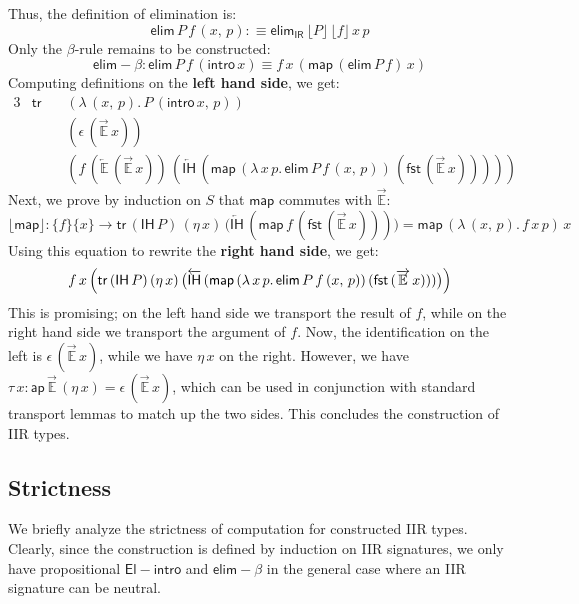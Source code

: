 \documentclass[acmsmall,screen,review,anonymous]{acmart}
\newcommand{\msf}[1]{{\mathsf{#1}}}
\newcommand{\mbb}[1]{\mathbb{#1}}
\newcommand{\IR}{\msf{IR}}
\newcommand{\intro}{\msf{intro}}
\newcommand{\IH}{\msf{IH}}
\newcommand{\map}{\msf{map}}
\newcommand{\elim}{\msf{elim}}
\newcommand{\tr}{\msf{tr}}
\newcommand{\fst}{\msf{fst}}
\newcommand{\floord}[1]{\lfloor #1 \rfloor}
\newcommand{\ora}[1]{\overrightarrow{#1}}
\newcommand{\ola}[1]{\overleftarrow{#1}}
\newcommand{\ap}{\msf{ap}}
\newcommand{\E}{\mbb{E}}
\begin{document}
Thus, the definition of elimination is:
\[ \elim\,P\,f\,(x,\,p) :\equiv \elim_\IR\,\floord{P}\,\floord{f}\,x\,p \]
Only the $\beta$-rule remains to be constructed:
\[ \elim\!-\!\!\beta : \elim\,P\,f\,(\intro\,x) \equiv f\,x\,(\map\,(\elim\,P\,f)\,x) \]
Computing definitions on the \textbf{left hand side}, we get:
\begin{alignat*}{3}
  & \tr\, &&(\lambda\,(x,\,p).\,P\,(\intro\,x,\,p))\\
  &       &&(\epsilon\,(\ora{\E}\,x))\\
  &       &&(f\,(\ola{\E}\,(\ora{\E}\,x))\,(\ola{\IH}\,(\map\,(\lambda\,x\,p.\,\elim\,P\,f\,(x,\,p))\,(\fst\,(\ora{\E}\,x)))))
\end{alignat*}
Next, we prove by induction on $S$ that $\map$ commutes with $\ora{\E}$:
\[ \floord{\map} : \{f\}\{x\} \to \tr\,(\IH\,P)\,(\eta\,x)\,\bigl(\ola{\IH}\,(\map\,f\,(\fst\,(\ora{\E}\,x)))\bigr) = \map\,(\lambda\,(x,\,p).\,f\,x\,p)\,x \]
Using this equation to rewrite the \textbf{right hand side}, we get:
\begin{alignat*}{3}
  f\,x\,\Bigl(\tr\,(\IH\,P)\,(\eta\,x)\,\bigl(\ola{\IH}\,(\map\,(\lambda\,x\,p.\,\elim\,P\,f\,(x,\,p))\,(\fst\,(\ora{\E}\,x)))\bigr)\Bigr)
\end{alignat*}
This is promising; on the left hand side we transport the result of $f$, while on the right hand
side we transport the argument of $f$. Now, the identification on the left is
$\epsilon\,(\ora{\E}\,x)$, while we have $\eta\,x$ on the right. However, we have $\tau\,x :
\ap\,\ora{\E}\,(\eta\,x) = \epsilon\,(\ora{\E}\,x)$, which can be used in conjunction with
standard transport lemmas to match up the two sides. This concludes the construction of IIR types.

\subsection{Strictness}
We briefly analyze the strictness of computation for constructed IIR types. Clearly, since the
construction is defined by induction on IIR signatures, we only have propositional
$\msf{El\!\!-\!\!intro}$ and $\elim\!-\!\!\beta$ in the general case where an IIR signature can be
neutral.
\end{document}
